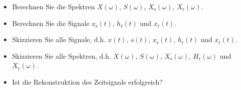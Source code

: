 \begin{itemize}
  \item Berechnen Sie die Spektren $X(\omega)$, $S(\omega)$, $X_\mathrm{s}(\omega)$, $X_\mathrm{r}(\omega)$.
  \item Berechnen Sie die Signale $x_\mathrm{s}(t)$, $h_\mathrm{r}(t)$ und $x_\mathrm{r}(t)$.
  \item Skizzieren Sie alle Signale, d.h. $x(t)$, $s(t)$, $x_\mathrm{s}(t)$, $h_\mathrm{r}(t)$ und $x_\mathrm{r}(t)$.
  \item Skizzieren Sie alle Spektren, d.h.  $X(\omega)$, $S(\omega)$, $X_\mathrm{s}(\omega)$, $H_\mathrm{r}(\omega)$ und $X_\mathrm{r}(\omega)$.
  \item Ist die Rekonstruktion des Zeitsignals erfolgreich?
\end{itemize}






